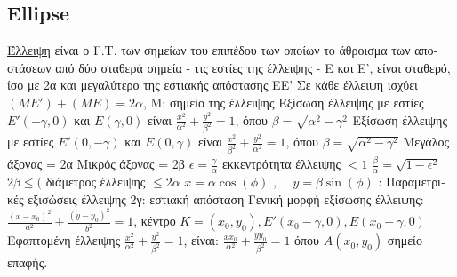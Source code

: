 \documentclass[12pt]{article}
\begin{document}
\begin{flushleft}
	\subsection{Ellipse}
	
	\textbullet \quad \uline{\textgreek{Έλλειψη}} \textgreek{είναι ο Γ.Τ. των σημείων του επιπέδου των οποίων το άθροισμα των αποστάσεων από δύο σταθερά σημεία - τις εστίες της έλλειψης - Ε και Ε', είναι σταθερό, ίσο με 2α και μεγαλύτερο της εστιακής απόστασης ΕΕ'} \linebreak 
	\textbullet \quad \textgreek{Σε κάθε έλλειψη ισχύει} $(ME')+(ME)=2\alpha$, \textgreek{Μ: σημείο της έλλειψης} \linebreak 
	\textbullet \quad \textgreek{Εξίσωση έλλειψης με εστίες} $E'(-\gamma,0)$ \textgreek{και} $E(\gamma,0)$ \textgreek{είναι} $\displaystyle \frac{x^2}{\alpha^2} + \frac{y^2}{\beta^2} = 1$, \textgreek{όπου} $\displaystyle \beta = \sqrt{\alpha^2 - \gamma^2} $ \linebreak 
	\textbullet \quad \textgreek{Εξίσωση έλλειψης με εστίες} $E'(0, -\gamma)$ \textgreek{και} $E(0,\gamma)$ \textgreek{είναι} $\displaystyle \frac{x^2}{\beta^2} + \frac{y^2}{\alpha^2} = 1$, \textgreek{όπου} $\displaystyle \beta = \sqrt{\alpha^2 - \gamma^2} $ \linebreak 
	\textbullet \quad \textgreek{Μεγάλος άξονας = 2α} \linebreak 
	\textbullet \quad \textgreek{Μικρός άξονας = 2β} \linebreak 
	\textbullet \quad $\displaystyle \epsilon = \frac{\gamma}{\alpha} $ \textgreek{εκκεντρότητα έλλειψης } $<1$ \linebreak 
	\textbullet \quad $\displaystyle \frac{\beta}{\alpha} = \sqrt{1-\epsilon^2} $ \linebreak 
	\textbullet \quad $2\beta \leq ($ \textgreek{διάμετρος έλλειψης} $\leq 2\alpha$ \linebreak 
	\textbullet \quad $\displaystyle x=\alpha \cos (\phi)$ , $\quad y=\beta \sin (\phi) $  :  \textgreek{Παραμετρικές εξισώσεις έλλειψης} \linebreak 
	\textbullet \quad \textgreek{2γ: εστιακή απόσταση} \linebreak 
	\textbullet \quad \textgreek{Γενική μορφή εξίσωσης έλλειψης:} $\displaystyle \frac{(x-x_0)^2}{a^2} +\frac{(y-y_0)^2}{b^2} = 1$, \textgreek{κέντρο} $K = (x_0, y_0), E'(x_0 -\gamma, 0), E(x_0 + \gamma,0)$ \linebreak 
	\textbullet \quad \textgreek{Εφαπτομένη έλλειψης} $\displaystyle \frac{x^2}{\alpha^2} + \frac{y^2}{\beta^2} = 1$, \textgreek{είναι}: $ \frac{xx_0}{\alpha^2} + \frac{yy_0}{\beta^2} = 1$ \textgreek{όπου} $A(x_0, y_0) $ \textgreek{σημείο επαφής}. \linebreak 

\end{flushleft}
\end{document}
